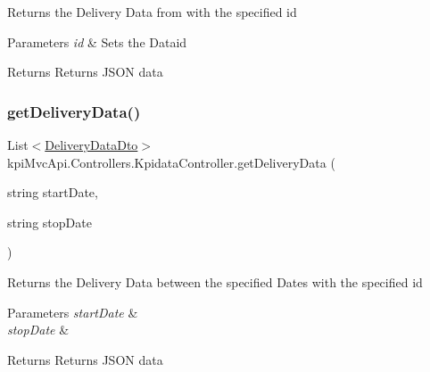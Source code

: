 Returns the Delivery Data from with the specified id 


\begin{DoxyParams}{Parameters}
{\em id} & Sets the Dataid\\
\hline
\end{DoxyParams}
\begin{DoxyReturn}{Returns}
Returns J\+S\+ON data
\end{DoxyReturn}
\mbox{\label{classkpi_mvc_api_1_1_controllers_1_1_kpidata_controller_aa080da542869888b3e45666e7e751b72}} 
\subsubsection{\texorpdfstring{get\+Delivery\+Data()}{getDeliveryData()}\hspace{0.1cm}{\footnotesize\ttfamily [3/3]}}
{\footnotesize\ttfamily List$<$\hyperlink{classkpi_mvc_api_1_1_data_transfer_objects_1_1_delivery_data_dto}{Delivery\+Data\+Dto}$>$ kpi\+Mvc\+Api.\+Controllers.\+Kpidata\+Controller.\+get\+Delivery\+Data (\begin{DoxyParamCaption}\item[{string}]{start\+Date,  }\item[{string}]{stop\+Date }\end{DoxyParamCaption})\hspace{0.3cm}{\ttfamily [inline]}}



Returns the Delivery Data between the specified Dates with the specified id 


\begin{DoxyParams}{Parameters}
{\em start\+Date} & \\
\hline
{\em stop\+Date} & \\
\hline
\end{DoxyParams}
\begin{DoxyReturn}{Returns}
Returns J\+S\+ON data
\end{DoxyReturn}
\mbox{\label{classkpi_mvc_api_1_1_controllers_1_1_kpidata_controller_ae5b9cebd2043650b2fd60caa72e49da7}} 
